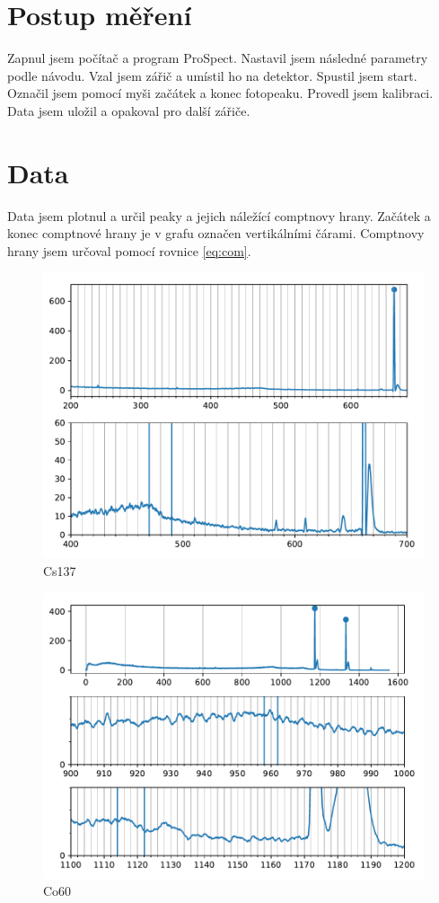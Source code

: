 \documentclass{article}
\begin{document}
\section{Postup měření}
Zapnul jsem počítač a program ProSpect.
Nastavil jsem následné parametry podle návodu.
Vzal jsem zářič a umístil ho na detektor.
Spustil jsem start.
Označil jsem pomocí myši začátek a konec fotopeaku.
Provedl jsem kalibraci.
Data jsem uložil a opakoval pro další zářiče.
\newpage
\section{Data}
Data jsem plotnul a určil peaky a jejich náležící comptnovy hrany.
Začátek a konec comptnové hrany je v grafu označen vertikálními čárami.
Comptnovy hrany jsem určoval pomocí rovnice \ref{eq:com}.
\begin{figure}[!h]
  \hspace*{-1em}
  \includegraphics[scale=0.8]{figs/Cs137.pdf}
  \caption{Cs137}
\end{figure}
\newpage
\begin{figure}[!h]
  \hspace*{-1em}
  \includegraphics[scale=0.8]{figs/Co60.pdf}
  \caption{Co60}
\end{figure}
\end{document}
